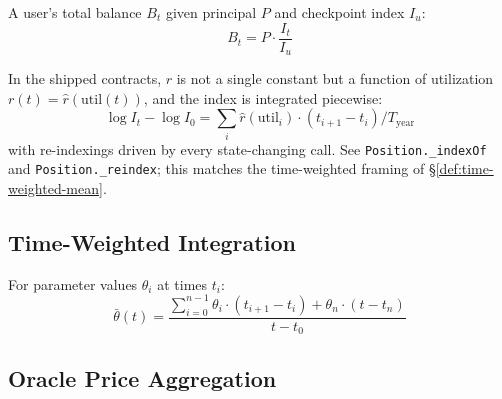 \documentclass[10pt,a4paper,twocolumn]{article}
\begin{document}
\begin{theorem}
A user's total balance $B_t$ given principal $P$ and checkpoint index $I_u$:
\begin{equation}
B_t = P \cdot \frac{I_t}{I_u}
\end{equation}
\end{theorem}

\begin{remark}
In the shipped contracts, $r$ is not a single constant but a function of utilization $r(t) = \hat r(\text{util}(t))$, and the index is integrated piecewise:
\begin{equation*}
\log I_t - \log I_0 = \sum_i \hat r(\text{util}_i) \cdot (t_{i+1} - t_i)/T_{\text{year}}
\end{equation*}
with re-indexings driven by every state-changing call. See \texttt{Position.\_indexOf} and \texttt{Position.\_reindex}; this matches the time-weighted framing of \S\ref{def:time-weighted-mean}.
\end{remark}

\subsection{Time-Weighted Integration}

\begin{definition}
\label{def:time-weighted-mean}
For parameter values $\theta_i$ at times $t_i$:
\begin{equation}
\bar{\theta}(t) = \frac{\sum_{i=0}^{n-1} \theta_i \cdot (t_{i+1} - t_i) + \theta_n \cdot (t - t_n)}{t - t_0}
\end{equation}
\end{definition}

\subsection{Oracle Price Aggregation}
\end{document}
